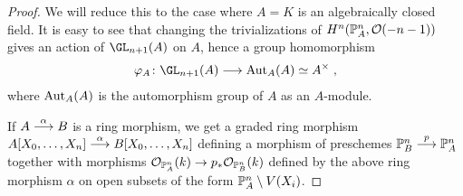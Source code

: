 \documentclass[a4paper,parskip=half,numbers=enddot, DIV=12]{scrreprt}
\begin{document}
\begin{proof}
	We will reduce this to the case where $A=K$ is an algebraically closed field. It is easy to see that changing the trivializations of $H^n(\mathbb{P}_A^n,\mathcal{O}(-n-1))$ gives an action of $\GL_{n+1}(A)$ on $A$, hence a group homomorphism 
	\begin{align*}
		\phi_A\colon \GL_{n+1}(A)\morphism\Aut_A(A)\simeq A^\times\;,
	\end{align*}
	where $\operatorname{Aut}_A(A)$ is the automorphism group of $A$ as an $A$-module. 
	
	If $A\morphism[\alpha]B$ is a ring morphism, we get a graded ring morphism $A[X_0,\ldots,X_n]\morphism[\alpha] B[X_0,\ldots,X_n]$ defining a morphism of preschemes $\IP_B^n\morphism[p]\IP_A^n$ together with morphisms $\Oo_{\IP_A^n}(k)\morphism p_*\Oo_{\IP_B^n}(k)$ defined by the above ring morphism $\alpha$ on open subsets of the form $\mathbb{P}_A^n\setminus V(X_i)$. 
	

\end{proof}
\end{document}
